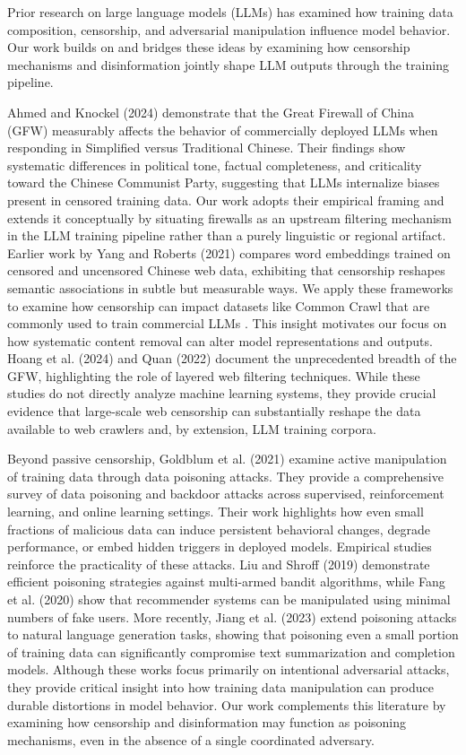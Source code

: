 \documentclass[conference=acm]{confpaper}
\begin{document}
Prior research on large language models (LLMs) has examined how training data composition, censorship, and adversarial manipulation influence model behavior. Our work builds on and bridges these ideas by examining how censorship mechanisms and disinformation jointly shape LLM outputs through the training pipeline.

Ahmed and Knockel (2024) \cite{Ahmed} demonstrate that the Great Firewall of China (GFW) measurably affects the behavior of commercially deployed LLMs when responding in Simplified versus Traditional Chinese. Their findings show systematic differences in political tone, factual completeness, and criticality toward the Chinese Communist Party, suggesting that LLMs internalize biases present in censored training data. Our work adopts their empirical framing and extends it conceptually by situating firewalls as an upstream filtering mechanism in the LLM training pipeline rather than a purely linguistic or regional artifact. Earlier work by Yang and Roberts (2021) \cite{Yang} compares word embeddings trained on censored and uncensored Chinese web data, exhibiting that censorship reshapes semantic associations in subtle but measurable ways. We apply these frameworks to examine how censorship can impact datasets like Common Crawl that are commonly used to train commercial LLMs \cite{Brown}. This insight motivates our focus on how systematic content removal can alter model representations and outputs. Hoang et al. (2024) \cite{Hoang} and Quan (2022) \cite{Quan} document the unprecedented breadth of the GFW, highlighting the role of layered web filtering techniques. While these studies do not directly analyze machine learning systems, they provide crucial evidence that large-scale web censorship can substantially reshape the data available to web crawlers and, by extension, LLM training corpora.

Beyond passive censorship, Goldblum et al. (2021) \cite{Goldblum} examine active manipulation of training data through data poisoning attacks. They provide a comprehensive survey of data poisoning and backdoor attacks across supervised, reinforcement learning, and online learning settings. Their work highlights how even small fractions of malicious data can induce persistent behavioral changes, degrade performance, or embed hidden triggers in deployed models. Empirical studies reinforce the practicality of these attacks. Liu and Shroff (2019) \cite{Liu} demonstrate efficient poisoning strategies against multi-armed bandit algorithms, while Fang et al. (2020) \cite{Fang} show that recommender systems can be manipulated using minimal numbers of fake users. More recently, Jiang et al. (2023) \cite{Jiang} extend poisoning attacks to natural language generation tasks, showing that poisoning even a small portion of training data can significantly compromise text summarization and completion models. Although these works focus primarily on intentional adversarial attacks, they provide critical insight into how training data manipulation can produce durable distortions in model behavior. Our work complements this literature by examining how censorship and disinformation may function as poisoning mechanisms, even in the absence of a single coordinated adversary.
\end{document}
